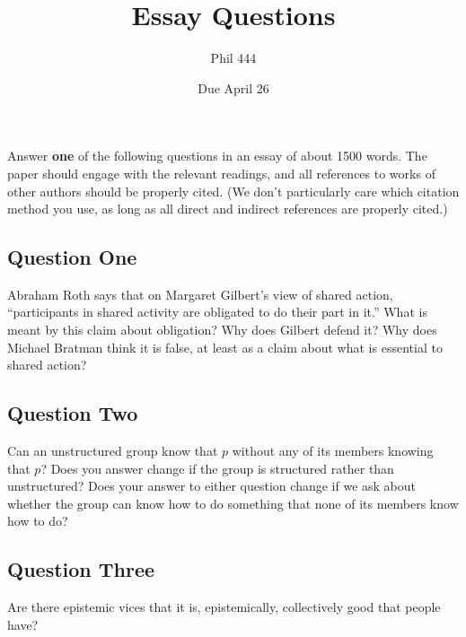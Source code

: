 \documentclass[
]{article}
\title{Essay Questions}
\author{Phil 444}
\date{Due April 26}
\begin{document}
\maketitle

Answer \textbf{one} of the following questions in an essay of about 1500
words. The paper should engage with the relevant readings, and all
references to works of other authors should be properly cited. (We don't
particularly care which citation method you use, as long as all direct
and indirect references are properly cited.)

\hypertarget{question-one}{%
\subsection*{Question One}\label{question-one}}

Abraham Roth says that on Margaret Gilbert's view of shared action,
``participants in shared activity are obligated to do their part in
it.'' What is meant by this claim about obligation? Why does Gilbert
defend it? Why does Michael Bratman think it is false, at least as a
claim about what is essential to shared action?

\hypertarget{question-two}{%
\subsection*{Question Two}\label{question-two}}

Can an unstructured group know that \(p\) without any of its members
knowing that \(p\)? Does you answer change if the group is structured
rather than unstructured? Does your answer to either question change if
we ask about whether the group can know how to do something that none of
its members know how to do?

\hypertarget{question-three}{%
\subsection*{Question Three}\label{question-three}}

Are there epistemic vices that it is, epistemically, collectively good
that people have?
\end{document}
